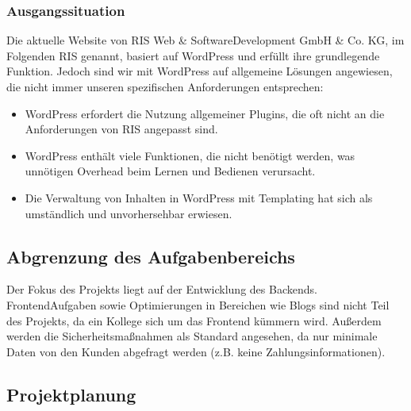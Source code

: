 \documentclass[a4paper,12pt,ngerman]{sphinxmanual}
\begin{document}
\subsubsection{Ausgangssituation}
\label{\detokenize{sections/projektplanung_analyse:ausgangssituation}}
\sphinxAtStartPar
Die aktuelle Website von RIS Web\sphinxhyphen{} \& Software\sphinxhyphen{}Development GmbH \& Co. KG, im Folgenden RIS genannt, basiert auf WordPress und erfüllt ihre grundlegende Funktion. Jedoch sind wir mit WordPress auf allgemeine Lösungen angewiesen, die nicht immer unseren spezifischen Anforderungen entsprechen:
\begin{itemize}
\item {} 
\sphinxAtStartPar
WordPress erfordert die Nutzung allgemeiner Plugins, die oft nicht an die Anforderungen von RIS angepasst sind.

\item {} 
\sphinxAtStartPar
WordPress enthält viele Funktionen, die nicht benötigt werden, was unnötigen Overhead beim Lernen und Bedienen verursacht.

\item {} 
\sphinxAtStartPar
Die Verwaltung von Inhalten in WordPress mit Templating hat sich als umständlich und unvorhersehbar erwiesen.

\end{itemize}


\subsection{Abgrenzung des Aufgabenbereichs}
\label{\detokenize{sections/projektplanung_analyse:abgrenzung-des-aufgabenbereichs}}
\sphinxAtStartPar
Der Fokus des Projekts liegt auf der Entwicklung des Backends. Frontend\sphinxhyphen{}Aufgaben sowie Optimierungen in Bereichen wie Blogs sind nicht Teil des Projekts, da ein Kollege sich um das Frontend kümmern wird. Außerdem werden die Sicherheitsmaßnahmen als Standard angesehen, da nur minimale Daten von den Kunden abgefragt werden (z.B. keine Zahlungsinformationen).


\subsection{Projektplanung}
\label{\detokenize{sections/projektplanung_analyse:projektplanung}}
\end{document}
